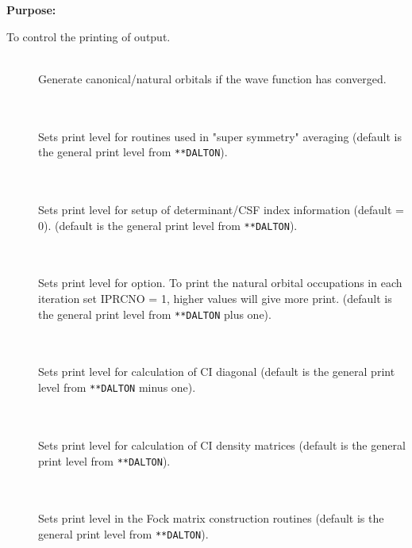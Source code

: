 {\bf Purpose:}

To control the printing of output.

\begin{description}
\item[] \ \\
  Generate canonical/natural orbitals if the wave function has
  converged.

\item[] \ \\
   \\
  Sets print level for routines used in "super symmetry" averaging
  (default is the general print level from \verb|**DALTON|).

\item[] \ \\
   \\
  Sets print level for setup of determinant/CSF index information (default = 0).
  (default is the general print level from \verb|**DALTON|).

\item[] \ \\
   \\
  Sets print level for  option.
  To print the natural orbital occupations in each iteration set
  IPRCNO = 1, higher values will give more print.
  (default is the general print level from \verb|**DALTON| plus one).

\item[] \ \\
   \\
  Sets print level for calculation of CI diagonal
  (default is the general print level from \verb|**DALTON| minus one).

\item[] \ \\
   \\
  Sets print level for calculation of CI density matrices
  (default is the general print level from \verb|**DALTON|).


\item[] \ \\
   \\
  Sets print level in the Fock matrix construction routines
  (default is the general print level from \verb|**DALTON|).


\end{description}
